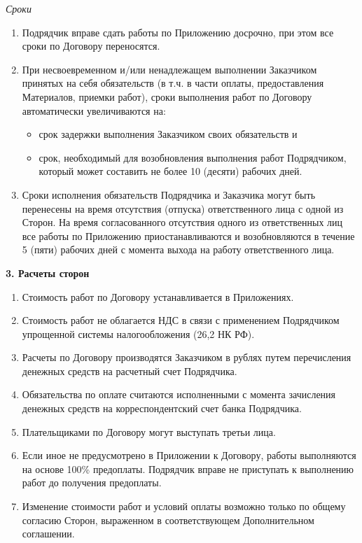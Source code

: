 \documentclass[a4paper, fontsize=12bp]{article}
\newcounter{enum}
\begin{document}
\noindent 
\textit{Сроки}
\begin{enumerate}[label=\arabic{enum}.\arabic*., resume]

\item Подрядчик вправе сдать работы по Приложению досрочно, при этом все сроки по Договору переносятся.

\item При несвоевременном и/или ненадлежащем выполнении Заказчиком принятых на себя обязательств (в т.ч. в части оплаты, предоставления Материалов, приемки работ), сроки выполнения работ по Договору автоматически увеличиваются на:
\begin{itemize}
	\item срок задержки выполнения Заказчиком своих обязательств и
	\item срок, необходимый для возобновления выполнения работ Подрядчиком, который может составить не более 10 (десяти) рабочих дней.
\end{itemize}

\item Сроки исполнения обязательств Подрядчика и Заказчика могут быть перенесены на время отсутствия (отпуска) ответственного лица с одной из Сторон. На время согласованного отсутствия одного из ответственных лиц все работы по Приложению приостанавливаются и возобновляются в течение 5 (пяти) рабочих дней с момента выхода на работу ответственного лица.
\end{enumerate}



\begin{center}
\textbf{3. Расчеты сторон}
\end{center}
\begin{enumerate}[label=\arabic{enum}.\arabic*.]
\item Стоимость работ по Договору устанавливается в Приложениях.

\item Стоимость работ не облагается НДС в связи с применением Подрядчиком упрощенной системы налогообложения (26,2 НК РФ).

\item Расчеты по Договору производятся Заказчиком в рублях путем перечисления денежных средств на расчетный счет Подрядчика.

\item Обязательства по оплате считаются исполненными с момента зачисления денежных средств на корреспондентский счет банка Подрядчика.

\item Плательщиками по Договору могут выступать третьи лица.

\item Если иное не предусмотрено в Приложении к Договору, работы выполняются на основе 100\% предоплаты. Подрядчик вправе не приступать к выполнению работ до получения предоплаты.

\item Изменение стоимости работ и условий оплаты возможно только по общему согласию Сторон, выраженном в соответствующем Дополнительном соглашении.
\end{enumerate}
\end{document}
